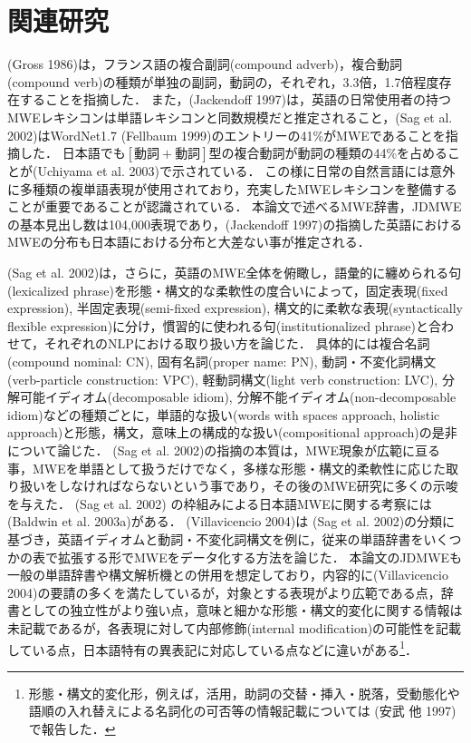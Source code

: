 \documentclass[japanese]{jnlp_1.4}
\begin{document}
\section{関連研究}

(Gross 1986)は，フランス語の複合副詞(compound adverb)，複合動詞(compound verb)の種類が単独の副詞，動詞の，それぞれ，3.3倍，1.7倍程度存在することを指摘した．
また，(Jackendoff 1997)は，英語の日常使用者の持つMWEレキシコンは単語レキシコンと同数規模だと推定されること，(Sag et al. 2002)はWordNet1.7 (Fellbaum 1999)のエントリーの41\%がMWEであることを指摘した．
日本語でも$[\text{動詞}+\text{動詞}]$型の複合動詞が動詞の種類の44\%を占めることが(Uchiyama et al. 2003)で示されている．
この様に日常の自然言語には意外に多種類の複単語表現が使用されており，充実したMWEレキシコンを整備することが重要であることが認識されている．
本論文で述べるMWE辞書，JDMWEの基本見出し数は104,000表現であり，(Jackendoff 1997)の指摘した英語におけるMWEの分布も日本語における分布と大差ない事が推定される．

(Sag et al. 2002)は，さらに，英語のMWE全体を俯瞰し，語彙的に纏められる句(lexicalized phrase)を形態・構文的な柔軟性の度合いによって，固定表現(fixed expression), 半固定表現(semi-fixed expression), 構文的に柔軟な表現(syntactically flexible expression)に分け，慣習的に使われる句(institutionalized phrase)と合わせて，それぞれのNLPにおける取り扱い方を論じた．
具体的には複合名詞(compound nominal: CN), 固有名詞(proper name: PN), 動詞・不変化詞構文(verb-particle construction: VPC), 軽動詞構文(light verb construction: LVC), 分解可能イディオム(decomposable idiom), 分解不能イディオム(non-decomposable idiom)などの種類ごとに，単語的な扱い(words with spaces approach, holistic approach)と形態，構文，意味上の構成的な扱い(compositional approach)の是非について論じた．
(Sag et al. 2002)の指摘の本質は，MWE現象が広範に亘る事，MWEを単語として扱うだけでなく，多様な形態・構文的柔軟性に応じた取り扱いをしなければならないという事であり，その後のMWE研究に多くの示唆を与えた．
(Sag et al. 2002) の枠組みによる日本語MWEに関する考察には(Baldwin et al. 2003a)がある．
(Villavicencio 2004)は (Sag et al. 2002)の分類に基づき，英語イディオムと動詞・不変化詞構文を例に，従来の単語辞書をいくつかの表で拡張する形でMWEをデータ化する方法を論じた．
本論文のJDMWEも一般の単語辞書や構文解析機との併用を想定しており，内容的に(Villavicencio 2004)の要請の多くを満たしているが，対象とする表現がより広範である点，辞書としての独立性がより強い点，意味と細かな形態・構文的変化に関する情報は未記載であるが，各表現に対して内部修飾(internal modification)の可能性を記載している点，日本語特有の異表記に対応している点などに違いがある\footnote{形態・構文的変化形，例えば，活用，助詞の交替・挿入・脱落，受動態化や語順の入れ替えによる名詞化の可否等の情報記載については (安武 他 1997)で報告した．}．
\end{document}
